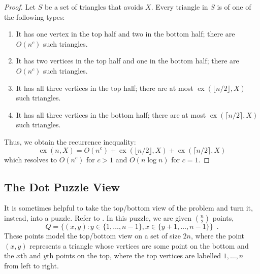 \documentclass{patmorin}
\DeclareMathOperator{\ex}{ex}
\begin{document}
\begin{proof}
   Let $S$ be a set of triangles that avoids $X$.  
   Every triangle in $S$
   is of one of the following types:
   \begin{enumerate}
      \item It has one vertex in the top half and two in the bottom half; there are $O(n^{c})$ such triangles.
      \item It has two vertices in the top half and one in the bottom half; there are $O(n^{c})$ such triangles.
      \item It has all three vertices in the top half; there are at most $\ex(\lfloor n/2\rfloor,X)$ such triangles.
      \item It has all three vertices in the bottom half; there are at most $\ex(\lceil n/2\rceil,X)$ such triangles.
   \end{enumerate}
   Thus, we obtain the recurrence inequality:
   \[  \ex(n,X) = O(n^{c}) + \ex(\lfloor n/2\rfloor,X) + \ex(\lceil n/2\rceil,X) \]
   which resolves to $O(n^c)$ for $c>1$ and $O(n\log n)$ for $c=1$.
\end{proof}


\subsection{The Dot Puzzle View}

It is sometimes helpful to take the top/bottom view of the problem
and turn it, instead, into a puzzle.  Refer to .
In this puzzle, we are given $\binom{n}{2}$ points,
\[
    Q = \{(x,y): y\in\{1,\ldots,n-1\}, x\in\{y+1,\ldots,n-1\} \} \enspace .
\]
These points model the top/bottom view on a set of size $2n$, where the
point $(x,y)$ represents a triangle whose vertices are some point on
the bottom and the $x$th and $y$th points on the top, where the top
vertices are labelled $1,\ldots,n$ from left to right.
\end{document}
